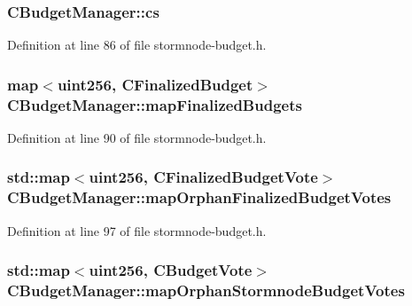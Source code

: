 \subsubsection[{cs}]{ C\+Budget\+Manager\+::cs\hspace{0.3cm}{\ttfamily [mutable]}}\label{class_c_budget_manager_a67d5cdc1a964de128a2ba4d4b5590ebd}


Definition at line 86 of file stormnode-\/budget.\+h.

\hypertarget{class_c_budget_manager_a68738720aa55de4b90fb10fb584547a9}{}
\subsubsection[{map\+Finalized\+Budgets}]{\setlength{\rightskip}{0pt plus 5cm}map$<${\bf uint256}, {\bf C\+Finalized\+Budget}$>$ C\+Budget\+Manager\+::map\+Finalized\+Budgets}\label{class_c_budget_manager_a68738720aa55de4b90fb10fb584547a9}


Definition at line 90 of file stormnode-\/budget.\+h.

\hypertarget{class_c_budget_manager_ad0d6a72545f4057ff5ffba11fc122ac7}{}
\subsubsection[{map\+Orphan\+Finalized\+Budget\+Votes}]{\setlength{\rightskip}{0pt plus 5cm}std\+::map$<${\bf uint256}, {\bf C\+Finalized\+Budget\+Vote}$>$ C\+Budget\+Manager\+::map\+Orphan\+Finalized\+Budget\+Votes}\label{class_c_budget_manager_ad0d6a72545f4057ff5ffba11fc122ac7}


Definition at line 97 of file stormnode-\/budget.\+h.

\hypertarget{class_c_budget_manager_a624092b33094fec6d113a94e79647c90}{}
\subsubsection[{map\+Orphan\+Stormnode\+Budget\+Votes}]{\setlength{\rightskip}{0pt plus 5cm}std\+::map$<${\bf uint256}, {\bf C\+Budget\+Vote}$>$ C\+Budget\+Manager\+::map\+Orphan\+Stormnode\+Budget\+Votes}\label{class_c_budget_manager_a624092b33094fec6d113a94e79647c90}


